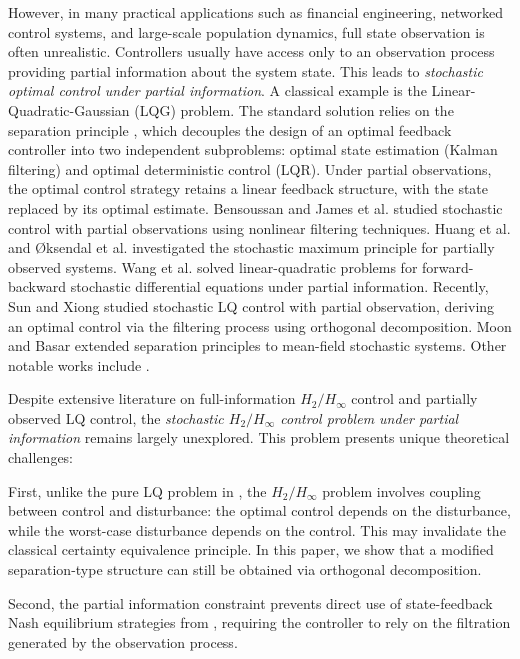 \documentclass[lettersize,journal]{IEEEtran}
\theoremstyle{plain}
\theoremstyle{definition}
\begin{document}
\IEEEpubidadjcol

However, in many practical applications such as financial engineering, networked control systems, and large-scale population dynamics, full state observation is often unrealistic. Controllers usually have access only to an observation process providing partial information about the system state. This leads to \textit{stochastic optimal control under partial information}. A classical example is the Linear-Quadratic-Gaussian (LQG) problem. The standard solution relies on the separation principle \cite{Wonham1968, Davis1977}, which decouples the design of an optimal feedback controller into two independent subproblems: optimal state estimation (Kalman filtering) and optimal deterministic control (LQR). Under partial observations, the optimal control strategy retains a linear feedback structure, with the state replaced by its optimal estimate. Bensoussan \cite{Bensoussan1992} and James et al. \cite{James2002} studied stochastic control with partial observations using nonlinear filtering techniques. Huang et al. \cite{Huang2009} and Øksendal et al. \cite{Øksendal2010} investigated the stochastic maximum principle for partially observed systems. Wang et al. \cite{Wang2015} solved linear-quadratic problems for forward-backward stochastic differential equations under partial information. Recently, Sun and Xiong \cite{Sun2022} studied stochastic LQ control with partial observation, deriving an optimal control via the filtering process using orthogonal decomposition. Moon and Basar \cite{Moon2024} extended separation principles to mean-field stochastic systems. Other notable works include \cite{Wang2013, Wu2018, Li2019, Huang2020, Wang2021}.

Despite extensive literature on full-information $H_2/H_\infty$ control and partially observed LQ control, the \textit{stochastic $H_2/H_\infty$ control problem under partial information} remains largely unexplored. This problem presents unique theoretical challenges:

First, unlike the pure LQ problem in \cite{Sun2022, Moon2024}, the $H_2/H_\infty$ problem involves coupling between control and disturbance: the optimal control depends on the disturbance, while the worst-case disturbance depends on the control. This may invalidate the classical certainty equivalence principle. In this paper, we show that a modified separation-type structure can still be obtained via orthogonal decomposition.

Second, the partial information constraint prevents direct use of state-feedback Nash equilibrium strategies from \cite{Chen2004, Wang2023}, requiring the controller to rely on the filtration generated by the observation process.
\end{document}
